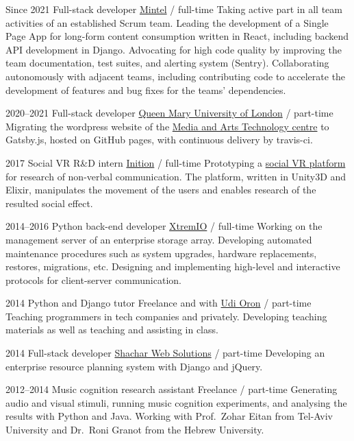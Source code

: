 \documentclass[]{friggeri-cv}
\begin{document}
\begin{entrylist}

  \entry
  {Since 2021}
  {Full-stack developer}
  {\href{https://www.mintel.com/}{Mintel} / full-time}
  {
    Taking active part in all team activities of an established Scrum team.
    Leading the development of a Single Page App for long-form content consumption written in React, including backend API development in Django.
    Advocating for high code quality by improving the team documentation, test suites, and alerting system (Sentry).
    Collaborating autonomously with adjacent teams, including contributing code to accelerate the development of features and bug fixes for the teams' dependencies.
  }

  \entry
  {2020--2021}
  {Full-stack developer}
  {\href{https://qmul.ac.uk/}{Queen Mary University of London} / part-time}
  {
    Migrating the wordpress website of the \href{https://mat.qmul.ac.uk/}{Media and Arts Technology centre} to Gatsby.js, hosted on GitHub pages, with continuous delivery by travis-ci.
  }

  \entry
  {2017}
  {Social VR R\&D intern}
  {\href{https://www.inition.co.uk/}{Inition} / full-time}
  {
    Prototyping a \href{https://github.com/Nagasaki45/UnsocialVR/}{social VR platform} for research of non-verbal communication. The platform, written in Unity3D and Elixir, manipulates the movement of the users and enables research of the resulted social effect.
  }

  \entry
  {2014--2016}
  {Python back-end developer}
  {\href{http://xtremio.com/}{XtremIO} / full-time}
  {
    Working on the management server of an enterprise storage array.
    Developing automated maintenance procedures such as system upgrades, hardware replacements, restores, migrations, etc.
    Designing and implementing high-level and interactive protocols for client-server communication.
  }

  \entry
  {2014}
  {Python and Django tutor}
  {Freelance and with \href{http://www.10x.org.il/}{Udi Oron} / part-time}
  {
    Teaching programmers in tech companies and privately.
    Developing teaching materials as well as teaching and assisting in class.
  }

  \entry
  {2014}
  {Full-stack developer}
  {\href{http://www.shachar-web.co.il/eng/}{Shachar Web Solutions} / part-time}
  {
    Developing an enterprise resource planning system with Django and jQuery.
  }

  \entry
  {2012--2014}
  {Music cognition research assistant}
  {Freelance / part-time}
  {
    Generating audio and visual stimuli, running music cognition experiments, and analysing the results with Python and Java.
    Working with Prof.\ Zohar Eitan from Tel-Aviv University and Dr.\ Roni Granot from the Hebrew University.
  }


\end{entrylist}
\end{document}
